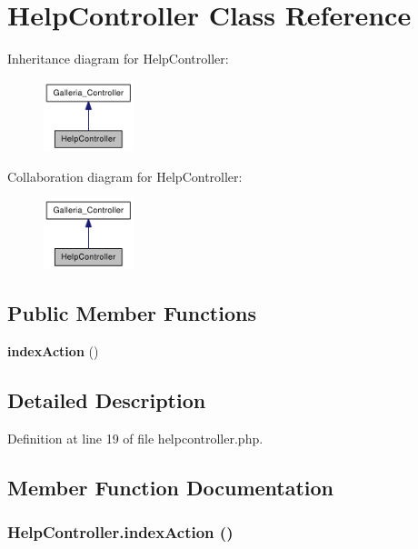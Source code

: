 \section{HelpController Class Reference}
\label{classHelpController}
Inheritance diagram for HelpController:\nopagebreak
\begin{figure}[H]
\begin{center}
\leavevmode
\includegraphics[width=74pt]{classHelpController__inherit__graph}
\end{center}
\end{figure}
Collaboration diagram for HelpController:\nopagebreak
\begin{figure}[H]
\begin{center}
\leavevmode
\includegraphics[width=74pt]{classHelpController__coll__graph}
\end{center}
\end{figure}
\subsection*{Public Member Functions}
\begin{CompactItemize}
\item 
{\bf indexAction} ()
\end{CompactItemize}


\subsection{Detailed Description}


Definition at line 19 of file helpcontroller.php.

\subsection{Member Function Documentation}
\subsubsection{\setlength{\rightskip}{0pt plus 5cm}HelpController.indexAction ()}\label{classHelpController_c5cd05d3d0348af035b59773d1768677}


